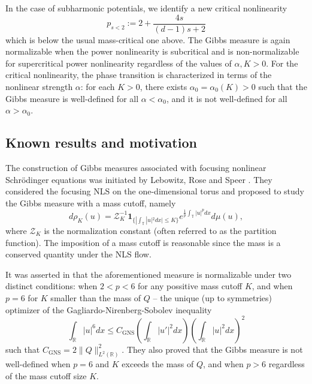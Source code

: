 \documentclass[%
11pt,  reqno]{amsart}
\theoremstyle{remarkstyle}
\newcommand{\1}{\hspace{0.2mm}\text{I}\hspace{0.2mm}}
\DeclareMathOperator{\GNS}{GNS}
\newcommand{\R}{\mathbb{R}}
\newcommand{\T}{\mathbb{T}}
\newcommand{\al}{\alpha}
\newcommand{\ind}{\mathbf 1}
\numberwithin{equation}{section}
\numberwithin{theorem}{section}
\begin{document}
	In the case of subharmonic potentials, we identify a new critical nonlinearity 
	$$p_{s < 2}:=2+\frac{4s}{(d-1)s+2}$$
	which is below the usual mass-critical one above. The Gibbs measure is again normalizable when the power nonlinearity is subcritical and is non-normalizable for supercritical power nonlinearity regardless of the values of $\al, K>0$. For the critical nonlinearity, the phase transition is characterized in terms of the nonlinear strength $\al$: for each $K>0$, there exists $\al_0=\al_0(K)>0$ such that the Gibbs measure is well-defined for all $\alpha <\al_0$, and it is not well-defined for all $\alpha>\al_0$.  
	
	
	\subsection{Known results and motivation}
	
	The construction of Gibbs measures associated with focusing nonlinear Schr\"odinger equations was initiated by Lebowitz, Rose and Speer \cite{LRS88}. They considered the focusing NLS on the one-dimensional torus and proposed to study the Gibbs measure with a mass cutoff, namely
	$$
	d\rho_K(u) = \mathcal Z^{-1}_K \ind_{\{|\int_{\T} |u|^2 dx| \leq K\}} e^{\frac{1}{p} \int_{\T} |u|^p dx} d\mu(u),
	$$ 
	where $\mathcal Z_K$ is the normalization constant (often referred to as the partition function). The imposition of a mass cutoff is reasonable since the mass is a conserved quantity under the NLS flow. 
	
	It was asserted in \cite{LRS88} that the aforementioned measure is normalizable under two distinct conditions: when $2<p<6$ for any possitive mass cutoff $K$, and when $p=6$ for $K$ smaller than the mass of $Q$ -- the unique (up to symmetries) optimizer of the Gagliardo-Nirenberg-Sobolev inequality
	$$
	\int_{\mathbb R} |u|^6 dx \leq C_{\GNS} \left(\int_{\mathbb R} |u'|^2 dx\right) \left(\int_{\mathbb R} |u|^2 dx\right)^2
	$$
	such that $C_{\GNS}=2\|Q\|^2_{L^2(\R)}$. They also proved that the Gibbs measure is not well-defined when $p=6$ and $K$ exceeds the mass of $Q$, and when $p>6$ regardless of the mass cutoff size $K$. 
	
\end{document}
